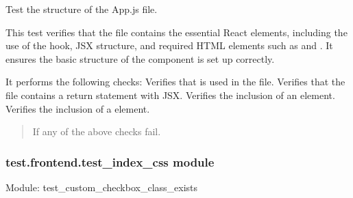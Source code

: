 \documentclass[letterpaper,10pt,english]{sphinxmanual}
\begin{document}

\begin{fulllineitems}
\label{\detokenize{test.frontend:test.frontend.test_app.test_app_structure}}
\pysigstartsignatures
\pysiglinewithargsret
{}
{}
{}
\pysigstopsignatures
\sphinxAtStartPar
Test the structure of the App.js file.

\sphinxAtStartPar
This test verifies that the  file contains the essential React elements, including
the use of the  hook, JSX structure, and required HTML elements such as  and .
It ensures the basic structure of the component is set up correctly.

\sphinxAtStartPar
It performs the following checks:
\sphinxhyphen{} Verifies that  is used in the file.
\sphinxhyphen{} Verifies that the file contains a return statement with JSX.
\sphinxhyphen{} Verifies the inclusion of an  element.
\sphinxhyphen{} Verifies the inclusion of a  element.
\begin{quote}\begin{description}
\sphinxAtStartPar
{} \textendash{} If any of the above checks fail.

\end{description}\end{quote}

\end{fulllineitems}



\subsubsection{test.frontend.test\_index\_css module}
\label{\detokenize{test.frontend:module-test.frontend.test_index_css}}\label{\detokenize{test.frontend:test-frontend-test-index-css-module}}
\sphinxAtStartPar
Module: test\_custom\_checkbox\_class\_exists
\end{document}
